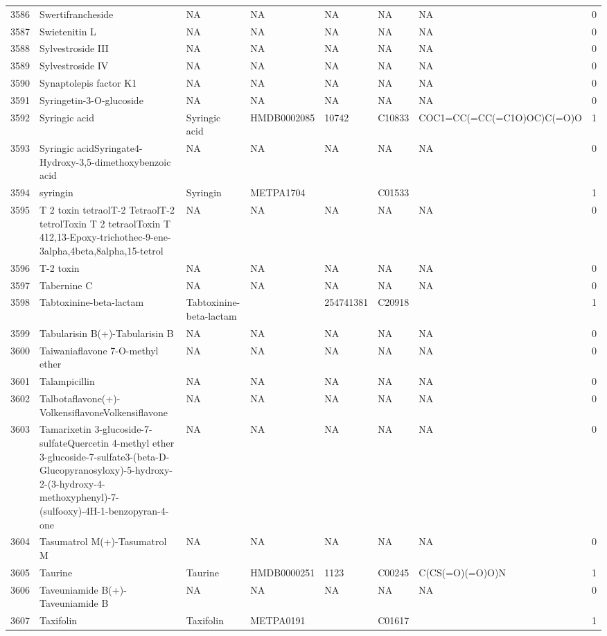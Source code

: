 \documentclass[a4paper]{article}
\begin{document}
\begin{longtable}{rlllllll}
  3586 & Swertifrancheside & NA & NA & NA & NA & NA & 0 \\ 
  3587 & Swietenitin L & NA & NA & NA & NA & NA & 0 \\ 
  3588 & Sylvestroside III & NA & NA & NA & NA & NA & 0 \\ 
  3589 & Sylvestroside IV & NA & NA & NA & NA & NA & 0 \\ 
  3590 & Synaptolepis factor K1 & NA & NA & NA & NA & NA & 0 \\ 
  3591 & Syringetin-3-O-glucoside & NA & NA & NA & NA & NA & 0 \\ 
  3592 & Syringic acid & Syringic acid & HMDB0002085 & 10742 & C10833 & COC1=CC(=CC(=C1O)OC)C(=O)O & 1 \\ 
  3593 & Syringic acidSyringate4-Hydroxy-3,5-dimethoxybenzoic acid & NA & NA & NA & NA & NA & 0 \\ 
  3594 & syringin & Syringin & METPA1704 &  & C01533 &  & 1 \\ 
  3595 & T 2 toxin tetraolT-2 TetraolT-2 tetrolToxin T 2 tetraolToxin T 412,13-Epoxy-trichothec-9-ene-3alpha,4beta,8alpha,15-tetrol & NA & NA & NA & NA & NA & 0 \\ 
  3596 & T-2 toxin & NA & NA & NA & NA & NA & 0 \\ 
  3597 & Tabernine C & NA & NA & NA & NA & NA & 0 \\ 
  3598 & Tabtoxinine-beta-lactam & Tabtoxinine-beta-lactam &  & 254741381 & C20918 &  & 1 \\ 
  3599 & Tabularisin B(+)-Tabularisin B & NA & NA & NA & NA & NA & 0 \\ 
  3600 & Taiwaniaflavone 7-O-methyl ether & NA & NA & NA & NA & NA & 0 \\ 
  3601 & Talampicillin & NA & NA & NA & NA & NA & 0 \\ 
  3602 & Talbotaflavone(+)-VolkensiflavoneVolkensiflavone & NA & NA & NA & NA & NA & 0 \\ 
  3603 & Tamarixetin 3-glucoside-7-sulfateQuercetin 4-methyl ether 3-glucoside-7-sulfate3-(beta-D-Glucopyranosyloxy)-5-hydroxy-2-(3-hydroxy-4-methoxyphenyl)-7-(sulfooxy)-4H-1-benzopyran-4-one & NA & NA & NA & NA & NA & 0 \\ 
  3604 & Tasumatrol M(+)-Tasumatrol M & NA & NA & NA & NA & NA & 0 \\ 
  3605 & Taurine & Taurine & HMDB0000251 & 1123 & C00245 & C(CS(=O)(=O)O)N & 1 \\ 
  3606 & Taveuniamide B(+)-Taveuniamide B & NA & NA & NA & NA & NA & 0 \\ 
  3607 & Taxifolin & Taxifolin & METPA0191 &  & C01617 &  & 1 \\ 

\end{longtable}
\end{document}
